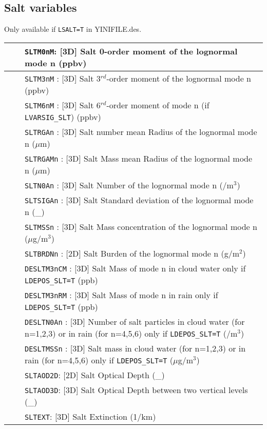 \subsection{Salt variables}
Only available if \verb|LSALT=T| in YINIFILE.des.
\begin{center}
\begin{makeimage}
\begin{tabular}{|>{\centering}p{3cm}|>{\centering}p{2.5cm}|p{11cm}|}
\hline
\multirow{23}{*}{by default}& &{\tt SLTM0nM}: [3D] Salt 0-order moment of the lognormal mode n (ppbv)\\\cline{3-3}
& &{\tt SLTM3nM} : [3D] Salt 3$^{rd}$-order moment of the lognormal mode n (ppbv)\\\cline{3-3}
& &{\tt SLTM6nM} : [3D] Salt 6$^{rd}$-order moment of mode n 
              {\small(if {\tt LVARSIG\_SLT})} (ppbv)\\\cline{3-3}
& &{\tt SLTRGAn} : [3D] Salt number mean Radius of the lognormal mode n ($\mu$m)
\\\cline{3-3}
& &{\tt SLTRGAMn} : [3D] Salt Mass mean Radius of the lognormal mode n ($\mu$m)\\\cline{3-3}
& &{\tt SLTN0An} : [3D] Salt Number of the lognormal mode n (/m$^3$)\\\cline{3-3}
& &{\tt SLTSIGAn} : [3D] Salt Standard deviation of the lognormal mode n (\_)\\\cline{3-3}
& &{\tt SLTMSSn} : [3D] Salt Mass concentration of the lognormal mode n 
($\mu$g/m$^3$)\\\cline{3-3}
& &{\tt SLTBRDNn} : [2D] Salt Burden of the lognormal mode n (g/m$^2$)\\\cline{3-3}
& &{\tt DESLTM3nCM}  : [3D] Salt Mass of mode n in cloud water only if \verb|LDEPOS_SLT=T| (ppb) \\\cline{3-3}
& &{\tt DESLTM3nRM}  : [3D] Salt  Mass of mode n in rain only if \verb|LDEPOS_SLT=T| (ppb)\\\cline{3-3}
& &{\tt DESLTN0An} : [3D] Number of salt particles in cloud water (for n=1,2,3) or in rain (for n=4,5,6) only if \verb|LDEPOS_SLT=T|  (/m$^3$)\\\cline{3-3}
& &{\tt DESLTMSSn} : [3D] Salt mass in cloud water (for n=1,2,3) or in rain (for n=4,5,6) only if \verb|LDEPOS_SLT=T| ($\mu$g/m$^3$)\\\cline{1-3}
\multirow{3}{*}{NRAD\_3D}& \multirow{3}{*}{$\ge$ 1}&{\tt SLTAOD2D}: [2D] Salt Optical Depth (\_)\\\cline{3-3}
& &{\tt SLTAOD3D}: [3D] Salt Optical Depth between two vertical levels (\_)
\\\cline{3-3}
& &{\tt SLTEXT}: [3D] Salt Extinction (1/km)\\\hline
\end{tabular} 
\end{makeimage}
\end{center}


